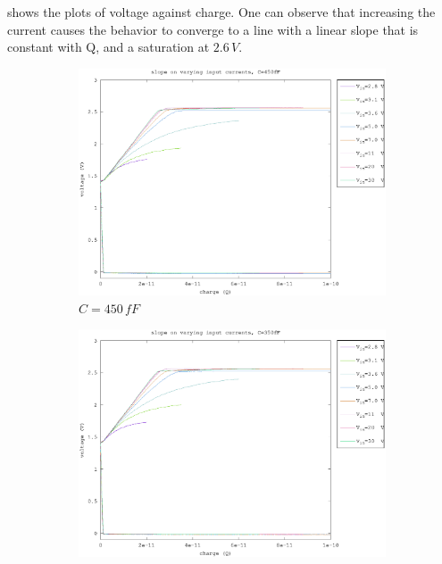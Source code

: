 \documentclass{article}
\begin{document}
 shows the plots of voltage against charge. One can observe that increasing the current causes the behavior to converge to a line with a linear slope that is constant with Q, and a saturation at $2.6\,V$. 

\begin{figure}[h]
	\centering
	\begin{subfigure}[b]{0.475\textwidth}
	    \centering
	    \includegraphics[width=\textwidth]{fig/vbo_charge_450fF.eps}
	    \caption[Network2]%
	    {$C=450\,fF$}    
	    \label{fig:vbo_charges_450fF}
	\end{subfigure}
	\hfill
	\begin{subfigure}[b]{0.475\textwidth}  
	    \centering 
	    \includegraphics[width=\textwidth]{fig/vbo_charge_350fF.eps}

\end{subfigure}
\end{figure}
\end{document}
